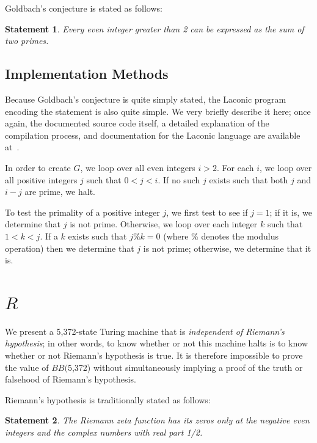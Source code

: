 \documentclass[11pt]{article}
\newtheorem{statement}{Statement}
\newcommand{\rmstatenumstate}{5,372-state }
\newcommand{\bbrmstatenum}{$BB($5,372) }
\begin{document}
Goldbach's conjecture is stated as follows:

\begin{statement}
\emph{Every even integer greater than 2 can be expressed as the sum of two primes.}
\label{goldbachstatement}
\end{statement}

\subsection{Implementation Methods}

Because Goldbach's conjecture is quite simply stated, the Laconic program encoding the statement is also quite simple. We very briefly describe it here; once again, the documented source code itself, a detailed explanation of the compilation process, and documentation for the Laconic language are available at~\cite{github}.

In order to create $G$, we loop over all even integers $i > 2$. For each $i$, we loop over all positive integers $j$ such that $0 < j < i$. If no such $j$ exists such that both $j$ and $i - j$ are prime, we halt.

To test the primality of a positive integer $j$, we first test to see if $j = 1$; if it is, we determine that $j$ is not prime. Otherwise, we loop over each integer $k$ such that $1 < k < j$. If a $k$ exists such that $j \% k = 0$ (where \% denotes the modulus operation) then we determine that $j$ is not prime; otherwise, we determine that it is.

\section{$R$}

We present a \rmstatenumstate Turing machine that is \emph{independent of Riemann's hypothesis}; in other words, to know whether or not this machine halts is to know whether or not Riemann's hypothesis is true. It is therefore impossible to prove the value of \bbrmstatenum without simultaneously implying a proof of the truth or falsehood of Riemann's hypothesis.

Riemann's hypothesis is traditionally stated as follows:

\begin{statement}
\emph{The Riemann zeta function has its zeros only at the negative even integers and the complex numbers with real part 1/2.}
\label{goldbachstatement}
\end{statement}
\end{document}
